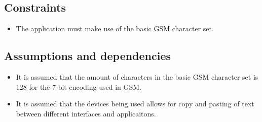 \subsection{Constraints}
\begin{itemize}
\item The application must make use of the basic GSM character set.
\end{itemize}



\subsection{Assumptions and dependencies}

\begin{itemize}
\item It is assumed that the amount of characters in the basic GSM character set is 128 for the 7-bit encoding used in GSM.
\item It is assumed that the devices being used allows for copy and pasting of text between different interfaces and applicaitons.
\end{itemize}
